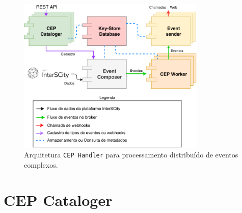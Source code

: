 \begin{figure}[hb!]
      \centering
      \includegraphics[width=0.8\textwidth]{figuras/neopr.pdf}
      \caption{Arquitetura \texttt{CEP Handler} para processamento distribuído de eventos complexos.}
      \label{fig:system_architecture}
\end{figure}


\section{CEP Cataloger} \label{sec:cepcataloger}

